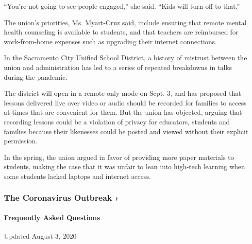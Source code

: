 ``You're not going to see people engaged,'' she said. ``Kids will turn
off to that.''

The union's priorities, Ms. Myart-Cruz said, include ensuring that
remote mental health counseling is available to students, and that
teachers are reimbursed for work-from-home expenses such as upgrading
their internet connections.

In the Sacramento City Unified School District, a history of mistrust
between the union and administration has led to a series of repeated
breakdowns in talks during the pandemic.

The district will open in a remote-only mode on Sept. 3, and has
proposed that lessons delivered live over video or audio should be
recorded for families to access at times that are convenient for them.
But the union has objected, arguing that recording lessons could be a
violation of privacy for educators, students and families because their
likenesses could be posted and viewed without their explicit permission.

In the spring, the union argued in favor of providing more paper
materials to students, making the case that it was unfair to lean into
high-tech learning when some students lacked laptops and internet
access.

\href{https://www.nytimes.com/news-event/coronavirus?action=click\&pgtype=Article\&state=default\&region=MAIN_CONTENT_3\&context=storylines_faq}{}

\hypertarget{the-coronavirus-outbreak-}{%
\subsubsection{The Coronavirus Outbreak
›}\label{the-coronavirus-outbreak-}}

\hypertarget{frequently-asked-questions}{%
\paragraph{Frequently Asked
Questions}\label{frequently-asked-questions}}

Updated August 3, 2020

